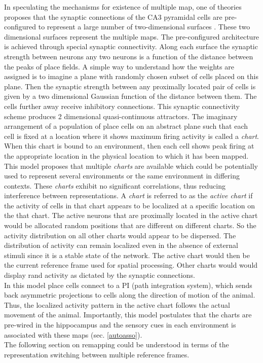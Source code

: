 In speculating the mechanisms for existence of multiple map, one of theories proposes that the synaptic connections of the CA3 pyramidal cells are pre-configured to represent a large number of two-dimensional surfaces \cite{Samsonovich1997}. These two dimensional surfaces represent the multiple maps. The pre-configured architecture is achieved through special synaptic connectivity. Along each surface the synaptic strength between neurons any two neurons is a function of the distance between the peaks of place fields.  %
A simple way to understand how the weights are assigned is to imagine a plane with randomly chosen subset of cells placed on this plane. Then the synaptic strength between any proximally located pair of cells is given by a two dimensional Gaussian function of the distance between them. The cells further away receive inhibitory connections. This synaptic connectivity scheme produces 2 dimensional quasi-continuous attractors. The imaginary arrangement of a population of place cells on an abstract plane such that each  cell is fixed at a location where it shows maximum firing activity is called a \emph{chart}. When this chart is bound to an environment, then each cell shows peak firing at the appropriate location in the physical location to which it has been mapped. This model proposes that multiple \emph{charts} are available which could be potentially used to represent several environments or the same environment in differing contexts. These \emph{charts} exhibit no significant correlations, thus reducing  interference between representations. A \emph{chart} is referred to as the \emph{active chart} if the activity of cells in that chart appears to be localized at a specific location on the that chart. The active neurons that are proximally located in the active chart would be allocated random positions that are different on different charts. So the activity distribution on all other charts would appear to be dispersed. The distribution of activity can remain localized even in the absence of external stimuli since it is a stable state of the network. The active chart would then be the current reference frame used for spatial processing. Other charts would would display rand activity as dictated by the synaptic connections. \\
In this model place cells connect to a PI (path integration system), which sends back asymmetric projections to cells along the direction of motion of the animal. Thus, the localized activity pattern in the active chart follows the actual movement of the animal. Importantly, this model postulates that the charts are pre-wired in the hippocampus and the sensory cues in each environment is associated with these maps (sec. \ref{autoasso}).\\
The following section on remapping could be understood in terms of the representation switching between multiple reference frames. 
